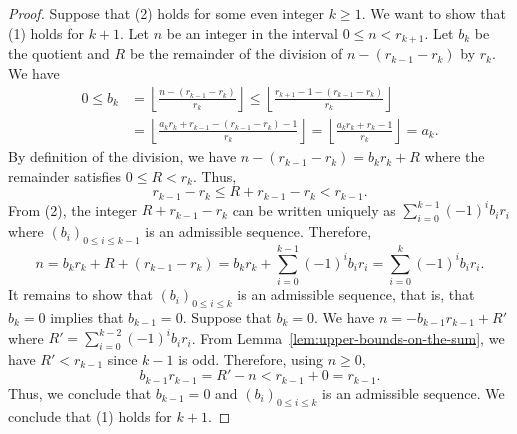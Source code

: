 \documentclass[a4paper,12pt]{amsart}
\newcommand{\0}{\mathtt{0}}
\newcommand{\1}{\mathtt{1}}
\newcommand{\2}{\mathtt{2}}
\newcommand{\3}{\mathtt{3}}
\begin{document}
\begin{proof}
    Suppose that (2) holds for some even integer $k\geq1$.
    We want to show that (1) holds for $k+1$.
    Let $n$ be an integer in the interval
    $0\leq n< r_{k+1}$.
    Let $b_{k}$ be the quotient and $R$ be the remainder
    of the division of $n-(r_{k-1}-r_{k})$ by $r_{k}$.
    We have
    \begin{align*}
        0\leq b_{k} &= \left\lfloor
        \frac{n-(r_{k-1}-r_{k})}
             {r_{k}}
            \right\rfloor
        \leq
            \left\lfloor
        \frac{r_{k+1}{-}1-(r_{k-1}-r_{k})}
             {r_{k}}
            \right\rfloor\\
        &=
            \left\lfloor
        \frac{a_{k}r_{k}+r_{k-1}-(r_{k-1}-r_{k}){-}1}
             {r_{k}}
            \right\rfloor
        =
            \left\lfloor
        \frac{a_{k}r_{k}+r_{k}-1}
             {r_{k}}
            \right\rfloor
        = a_{k}.
    \end{align*}
    By definition of the division, we have
    $n-(r_{k-1}-r_{k})=b_{k}r_{k} + R$
    where the remainder satisfies $0\leq R<r_{k}$.
    Thus,
    \[
        r_{k-1}-r_{k} \leq R+ r_{k-1}-r_{k}  < r_{k-1}.
    \]
    From (2), the integer $R+ r_{k-1}-r_{k}$
    can be written uniquely as
    $
        \sum_{i=0}^{k-1} (-1)^{i}b_{i}r_{i}
    $
    where $(b_i)_{0\leq i\leq k-1}$ is an admissible sequence.
    Therefore,
    \[
        n
        = b_{k}r_{k} + R+(r_{k-1}-r_{k})
        = b_{k}r_{k} + \sum_{i=0}^{k-1} (-1)^{i}b_{i}r_{i}
        = \sum_{i=0}^{k} (-1)^{i}b_{i}r_{i}.
    \]
    It remains to show that $(b_i)_{0\leq i\leq k}$ is an admissible sequence,
    that is, that $b_{k}=0$ implies that $b_{k-1}=0$.
    Suppose that $b_{k}=0$.
    We have
    $n = -b_{k-1}r_{k-1} + R'$
    where $R'=\sum_{i=0}^{k-2} (-1)^{i}b_{i}r_{i}$.
    From Lemma~\ref{lem:upper-bounds-on-the-sum}, we have $R'<r_{k-1}$ since $k-1$ is odd.
    Therefore, using $n\geq0$,
    \[
        b_{k-1}r_{k-1} = R' - n < r_{k-1} + 0 = r_{k-1}.
    \]
    Thus, we conclude that $b_{k-1}=0$
    and $(b_i)_{0\leq i\leq k}$ is an admissible sequence.
    We conclude that (1) holds for $k+1$.
\end{proof}
\end{document}
